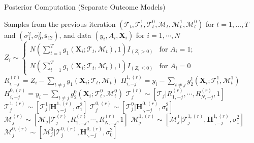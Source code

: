 \begin{algorithm}
\caption{Posterior Computation (Separate Outcome Models)}\label{alg:separate}
\begin{algorithmic}[1]
\Require Samples from the previous iteration $(\mathcal{T}_t, \mathcal{T}^1_t, \mathcal{T}^0_t,\mathcal{M}_t,\mathcal{M}_t^1,\mathcal{M}_t^0)$ for $t=1, \ldots, T$ and $(\sigma_1^2, \sigma_0^2, \boldsymbol{s}_{12})$, and data $(y_i, A_i, \boldsymbol{X}_i)$ for $i=1, \cdots, N$
\State $Z_i \sim \left\{ \begin{array}{ll}
         N\left(\sum_{t=1}^T g_1(\boldsymbol{X}_i; \mathcal{T}_t, \mathcal{M}_t), 1\right)I_{(Z_i  > 0)} & \mbox{for $A_i =1 $};\\
        N\left(\sum_{t=1}^T g_1(\boldsymbol{X}_i; \mathcal{T}_t, \mathcal{M}_t), 1\right)I_{(Z_i  \leq 0)} & \mbox{for $A_i = 0 $}\end{array} \right.$ 
\EndFor
{}
\State $R_{i,-j}^{(r)} = Z_i - \sum_{t\neq j} g_1(\boldsymbol{X}_i; \mathcal{T}_t, \mathcal{M}_t)$  
\State $H_{i,-j}^{1, (r)} = y_i - \sum_{t\neq j} g_2^1(\boldsymbol{X}_i; \mathcal{T}_t^1, \mathcal{M}_t^1)$  
\State $H_{i,-j}^{0, (r)} = y_i - \sum_{t\neq j} g_2^0(\boldsymbol{X}_i; \mathcal{T}_t^0, \mathcal{M}_t^0)$  
\EndFor
\State $\mathcal{T}_j^{(r)} \sim [\mathcal{T}_j | R_{1, -j}^{(r)}, \cdots, R_{N, -j}^{(r)}, 1]$  
\State $\mathcal{T}_j^{1,(r)} \sim [\mathcal{T}_j^1 | \boldsymbol{H}_{\cdot, -j}^{1, (r)}, \sigma^2_1]$  
\State $\mathcal{T}_j^{0,(r)} \sim [\mathcal{T}_j^0 | \boldsymbol{H}_{\cdot, -j}^{0, (r)}, \sigma^2_0]$  
\State $\mathcal{M}_j^{(r)} \sim [\mathcal{M}_j | \mathcal{T}_j^{(r)}, R_{1, -j}^{(r)}, \cdots, R_{N, -j}^{(r)}, 1]$
\State $\mathcal{M}_j^{1,(r)} \sim [\mathcal{M}_j^1 | \mathcal{T}_j^{1,(r)}, \boldsymbol{H}_{\cdot, -j}^{1,(r)}, \sigma^2_1]$
\State $\mathcal{M}_j^{0,(r)} \sim [\mathcal{M}_j^0 | \mathcal{T}_j^{0,(r)}, \boldsymbol{H}_{\cdot, -j}^{0,(r)}, \sigma^2_0]$


\end{algorithmic}
\end{algorithm}

